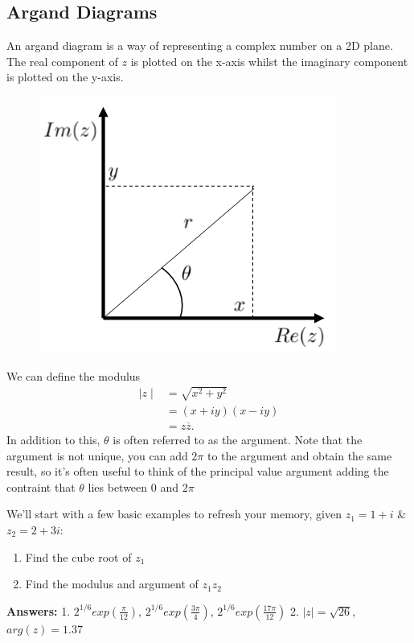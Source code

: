\subsection{Argand Diagrams}
An argand diagram is a way of representing a complex number on a 2D plane.
 The real component of $z$ is plotted on the x-axis whilst the imaginary component is plotted on the y-axis.
 \begin{minipage}[t]{0.47\linewidth}
 	\begin{figure}[H]
 		\centering
 		\includegraphics[width=\linewidth]{complex/argand}
 		\captionsetup{font=small} 	
 	\end{figure} 
 \end{minipage}
 \hspace{0.6cm}
%
\begin{minipage}[t]{0.47\linewidth}
	\vspace{1cm}
	We can define the modulus 
	\begin{align*}
	\mid z \mid &= \sqrt{x^2+y^2} \\
	&= (x+iy)(x-iy) \\
	&= z\overline{z}.
	\end{align*}
	In addition to this, $\theta$ is often referred to as the argument.
	 Note that the argument is not unique, you can add $2\pi$ to the argument and obtain the same result, so it's often useful to think of the principal value argument adding the contraint that $\theta$ lies between $0$ and $2\pi$
\end{minipage}
\begin{examples}
	We'll start with a few basic examples to refresh your memory, given $z_1=1+i$ \& $z_2=2+3i$:
	\begin{enumerate}
		\item Find the cube root of $z_1$
		\item Find the modulus and argument of $z_1z_2$
	\end{enumerate}
\textbf{Answers:} 1. $2^{1/6}exp(\frac{\pi}{12})$, $2^{1/6}exp(\frac{3\pi}{4})$, $2^{1/6}exp(\frac{17\pi}{12})$ \hspace{0.5cm}
2. $\mid z\mid = \sqrt{26}$, $arg(z)=1.37$
\end{examples}


